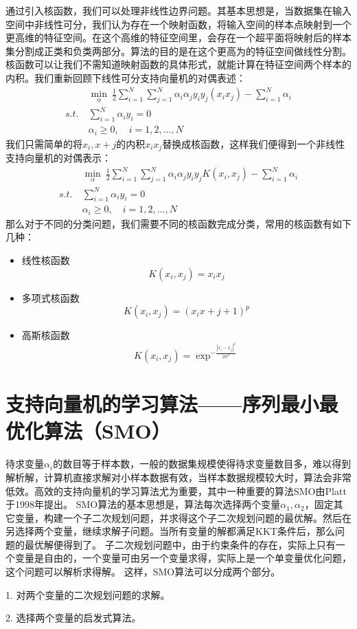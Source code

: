 通过引入核函数，我们可以处理非线性边界问题。其基本思想是，当数据集在输入空间中非线性可分，我们认为存在一个映射函数，将输入空间的样本点映射到一个更高维的特征空间。在这个高维的特征空间里，会存在一个超平面将映射后的样本集分割成正类和负类两部分。算法的目的是在这个更高为的特征空间做线性分割。核函数可以让我们不需知道映射函数的具体形式，就能计算在特征空间两个样本的内积。我们重新回顾下线性可分支持向量机的对偶表述：
\begin{align*}
    & \underset{\alpha}{\min}\ \frac{1}{2} \sum_{i=1}^N \sum_{j=1}^N \alpha_i \alpha_j y_i y_j (x_i x_j) - \sum_{i=1}^N \alpha_i \\
    s.t.\ & \sum_{i=1}^N \alpha_i y_i = 0 \\
          & \alpha_i \ge 0,\quad i=1, 2, ..., N
\end{align*}
我们只需简单的将$x_i,x+j$的内积$x_i x_j$替换成核函数，这样我们便得到一个非线性支持向量机的对偶表示：
\begin{align*}
    & \underset{\alpha}{\min}\ \frac{1}{2} \sum_{i=1}^N \sum_{j=1}^N \alpha_i \alpha_j y_i y_j K(x_i,x_j) - \sum_{i=1}^N \alpha_i \\
    s.t.\ & \sum_{i=1}^N \alpha_i y_i = 0 \\
          & \alpha_i \ge 0,\quad i=1, 2, ..., N
\end{align*}
那么对于不同的分类问题，我们需要不同的核函数完成分类，常用的核函数有如下几种：
\begin{itemize}
    \item 线性核函数\\
    $$K(x_i,x_j) = x_i x_j$$
    \item 多项式核函数\\
    $$K(x_i,x_j) = (x_i x+j + 1)^p $$
    \item 高斯核函数\\
    $$ K(x_i,x_j) = \exp^{-\frac{|x_i-x_j|^2}{2 \sigma^2}} $$
\end{itemize}

\section{支持向量机的学习算法——序列最小最优化算法（SMO）}
待求变量$\alpha_i$的数目等于样本数，一般的数据集规模使得待求变量数目多，难以得到解析解，计算机直接求解对小样本数据有效，当样本数据规模较大时，算法会非常低效。高效的支持向量机的学习算法尤为重要，其中一种重要的算法SMO由Platt于1998年提出。
SMO算法的基本思想是，算法每次选择两个变量$\alpha_1,\alpha_2$，固定其它变量，构建一个子二次规划问题，并求得这个子二次规划问题的最优解。然后在另选择两个变量，继续求解子问题。当所有变量的解都满足KKT条件后，那么问题的最优解便得到了。
子二次规划问题中，由于约束条件的存在，实际上只有一个变量是自由的，一个变量可由另一个变量求得，实际上是一个单变量优化问题，这个问题可以解析求得解。
这样，SMO算法可以分成两个部分。

1. 对两个变量的二次规划问题的求解。

2. 选择两个变量的启发式算法。
